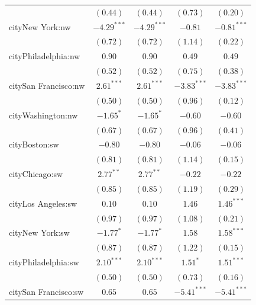 \documentclass[12pt,letter paper]{article}
\begin{document}
\begin{center}
\begin{longtable}{l c c c c }
                        & $(0.44)$      & $(0.44)$      & $(0.73)$      & $(0.20)$      \\
cityNew York:nw         & $-4.29^{***}$ & $-4.29^{***}$ & $-0.81$       & $-0.81^{***}$ \\
                        & $(0.72)$      & $(0.72)$      & $(1.14)$      & $(0.22)$      \\
cityPhiladelphia:nw     & $0.90$        & $0.90$        & $0.49$        & $0.49$        \\
                        & $(0.52)$      & $(0.52)$      & $(0.75)$      & $(0.38)$      \\
citySan Francisco:nw    & $2.61^{***}$  & $2.61^{***}$  & $-3.83^{***}$ & $-3.83^{***}$ \\
                        & $(0.50)$      & $(0.50)$      & $(0.96)$      & $(0.12)$      \\
cityWashington:nw       & $-1.65^{*}$   & $-1.65^{*}$   & $-0.60$       & $-0.60$       \\
                        & $(0.67)$      & $(0.67)$      & $(0.96)$      & $(0.41)$      \\
cityBoston:sw           & $-0.80$       & $-0.80$       & $-0.06$       & $-0.06$       \\
                        & $(0.81)$      & $(0.81)$      & $(1.14)$      & $(0.15)$      \\
cityChicago:sw          & $2.77^{**}$   & $2.77^{**}$   & $-0.22$       & $-0.22$       \\
                        & $(0.85)$      & $(0.85)$      & $(1.19)$      & $(0.29)$      \\
cityLos Angeles:sw      & $0.10$        & $0.10$        & $1.46$        & $1.46^{***}$  \\
                        & $(0.97)$      & $(0.97)$      & $(1.08)$      & $(0.21)$      \\
cityNew York:sw         & $-1.77^{*}$   & $-1.77^{*}$   & $1.58$        & $1.58^{***}$  \\
                        & $(0.87)$      & $(0.87)$      & $(1.22)$      & $(0.15)$      \\
cityPhiladelphia:sw     & $2.10^{***}$  & $2.10^{***}$  & $1.51^{*}$    & $1.51^{***}$  \\
                        & $(0.50)$      & $(0.50)$      & $(0.73)$      & $(0.16)$      \\
citySan Francisco:sw    & $0.65$        & $0.65$        & $-5.41^{***}$ & $-5.41^{***}$ \\

\end{longtable}
\end{center}
\end{document}
